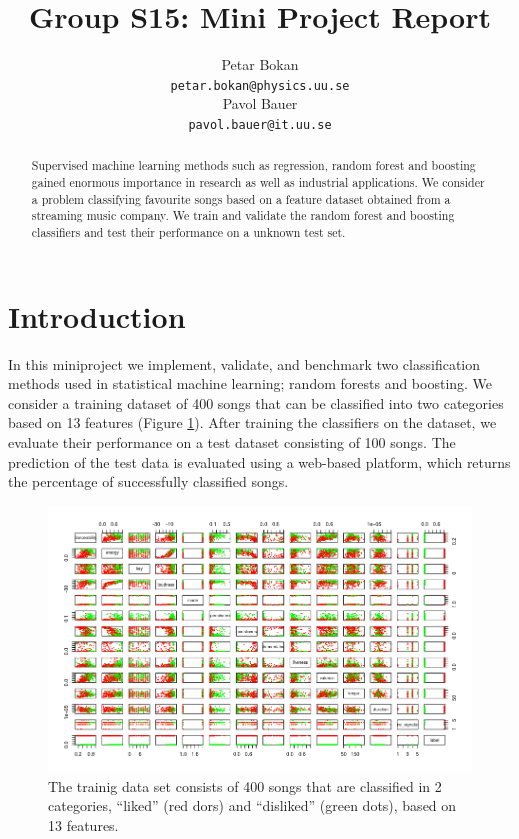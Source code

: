 \documentclass{article}
\title{Group S15: Mini Project Report}
\author{
  Petar Bokan \\
  \texttt{petar.bokan@physics.uu.se} \\
   \And
  Pavol Bauer \\
  \texttt{pavol.bauer@it.uu.se} \\
}
\begin{document}

\maketitle

\begin{abstract}
Supervised machine learning methods such as regression, random forest and boosting gained enormous importance in research as well as industrial applications.
We consider a problem classifying favourite songs based on a feature dataset obtained from a streaming music company.
We train and validate the random forest and boosting classifiers and test their performance on a unknown test set.

\end{abstract}

\section{Introduction}

In this miniproject we implement, validate, and benchmark two classification methods used in statistical machine learning; random forests and boosting.
We consider a training dataset of 400 songs that can be classified into two categories based on 13 features (Figure \ref{fig:pairs}).
After training the classifiers on the dataset, we evaluate their performance on a test dataset consisting of 100 songs.
The prediction of the test data is evaluated using a web-based platform, which returns the percentage of successfully classified songs.

\begin{figure}[htp!]
  \centering
  \includegraphics[height=0.5\textwidth] {figs/song_pairs.png}
  \caption{The trainig data set consists of 400 songs that are classified in 2 categories, ``liked'' (red dors) and ``disliked'' (green dots), based on 13 features.}
  \label{fig:pairs}
\end{figure}
\end{document}
